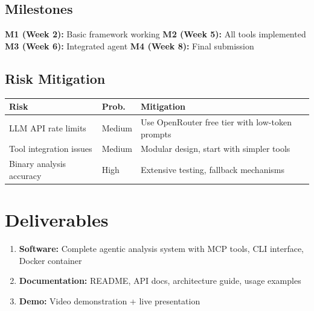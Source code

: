 \documentclass[11pt,a4paper]{article}
\begin{document}
\subsection{Milestones}
\textbf{M1 (Week 2):} Basic framework working \quad \textbf{M2 (Week 5):} All tools implemented \quad \textbf{M3 (Week 6):} Integrated agent \quad \textbf{M4 (Week 8):} Final submission

\subsection{Risk Mitigation}
\begin{tabular}{@{}lll@{}}
\toprule
\textbf{Risk} & \textbf{Prob.} & \textbf{Mitigation} \\
\midrule
LLM API rate limits & Medium & Use OpenRouter free tier with low-token prompts \\
Tool integration issues & Medium & Modular design, start with simpler tools \\
Binary analysis accuracy & High & Extensive testing, fallback mechanisms \\
\bottomrule
\end{tabular}

\section{Deliverables}
\begin{enumerate}
    \item \textbf{Software:} Complete agentic analysis system with MCP tools, CLI interface, Docker container
    \item \textbf{Documentation:} README, API docs, architecture guide, usage examples
    \item \textbf{Demo:} Video demonstration + live presentation
\end{enumerate}
\end{document}
